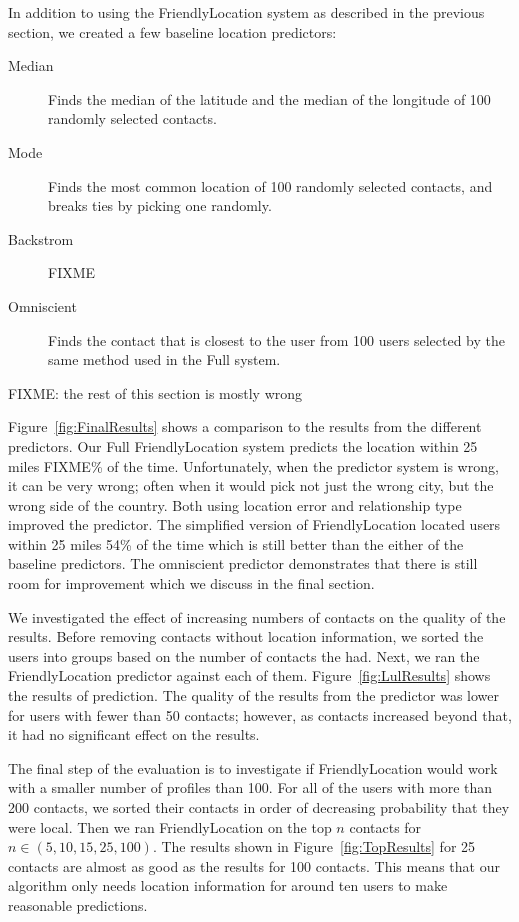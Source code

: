 In addition to using the FriendlyLocation system as described in the previous
section, we created a few baseline location predictors:
\begin{description}
\item[Median] Finds the median of the latitude and the median of the longitude
of 100 randomly selected contacts.
\item[Mode] Finds the most common location of 100 randomly selected contacts,
and breaks ties by picking one randomly.
\item[Backstrom] FIXME
\item[Omniscient] Finds the contact that is closest to the user from 100 users
selected by the same method used in the Full system.
\end{description}

FIXME: the rest of this section is mostly wrong

Figure~\ref{fig:FinalResults} shows a comparison to the results from the 
different predictors.
Our Full FriendlyLocation system predicts the location within 25 miles FIXME\% of
the time.
Unfortunately, when the predictor system is wrong, it can be very wrong; often
when it would pick not just the wrong city, but the wrong side of the
country.
Both using location error and relationship type improved the predictor.  The
simplified version of FriendlyLocation located users within 25 miles 54\% of
the time which is still better than the either of the baseline predictors.
The omniscient predictor demonstrates that there is still room for improvement
which we discuss in the final section.

We investigated the effect of increasing numbers of contacts on the quality of
the results.
Before removing contacts without location information, we sorted the users into
groups based on the number of contacts the had.
Next, we ran the FriendlyLocation predictor against each of them.
Figure~\ref{fig:LulResults} shows the results of prediction.
The quality of the results from the predictor was lower for users with fewer
than 50 contacts; however, as contacts increased beyond that, it had no
significant effect on the results.


The final step of the evaluation is to investigate if FriendlyLocation would
work with a smaller number of profiles than 100.
For all of the users with more than 200 contacts, we sorted their contacts in
order of decreasing probability that they were local.
Then we ran FriendlyLocation on the top \(n\) contacts for
\(n\in (5,10,15,25,100)\).
The results shown in Figure~\ref{fig:TopResults} for 25 contacts are almost as
good as the results for 100 contacts. This means that our algorithm only needs
location information for around ten users to make reasonable predictions.



